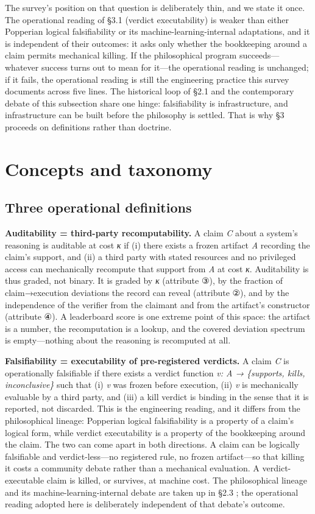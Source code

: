 \documentclass[11pt,a4paper]{article}
\begin{document}
The survey's position on that question is deliberately thin, and we state it once. The operational reading of §3.1 (verdict executability) is weaker than either Popperian logical falsifiability or its machine-learning-internal adaptations, and it is independent of their outcomes: it asks only whether the bookkeeping around a claim permits mechanical killing. If the philosophical program succeeds—whatever success turns out to mean for it—the operational reading is unchanged; if it fails, the operational reading is still the engineering practice this survey documents across five lines. The historical loop of §2.1 and the contemporary debate of this subsection share one hinge: falsifiability is infrastructure, and infrastructure can be built before the philosophy is settled. That is why §3 proceeds on definitions rather than doctrine.

\section{Concepts and taxonomy}

\subsection{Three operational definitions}

\textbf{Auditability = third-party recomputability.} A claim \textit{C} about a system's reasoning is auditable at cost \textit{κ} if (i) there exists a frozen artifact \textit{A} recording the claim's support, and (ii) a third party with stated resources and no privileged access can mechanically recompute that support from \textit{A} at cost \textit{κ}. Auditability is thus graded, not binary. It is graded by \textit{κ} (attribute ③), by the fraction of claim→execution deviations the record can reveal (attribute ②), and by the independence of the verifier from the claimant and from the artifact's constructor (attribute ④). A leaderboard score is one extreme point of this space: the artifact is a number, the recomputation is a lookup, and the covered deviation spectrum is empty—nothing about the reasoning is recomputed at all.

\textbf{Falsifiability = executability of pre-registered verdicts.} A claim \textit{C} is operationally falsifiable if there exists a verdict function \textit{v: A → \{supports, kills, inconclusive\}} such that (i) \textit{v} was frozen before execution, (ii) \textit{v} is mechanically evaluable by a third party, and (iii) a kill verdict is binding in the sense that it is reported, not discarded. This is the engineering reading, and it differs from the philosophical lineage: Popperian logical falsifiability is a property of a claim's logical form, while verdict executability is a property of the bookkeeping around the claim. The two can come apart in both directions. A claim can be logically falsifiable and verdict-less—no registered rule, no frozen artifact—so that killing it costs a community debate rather than a mechanical evaluation. A verdict-executable claim is killed, or survives, at machine cost. The philosophical lineage and its machine-learning-internal debate are taken up in §2.3 \cite{key27,key28}; the operational reading adopted here is deliberately independent of that debate's outcome.
\end{document}
